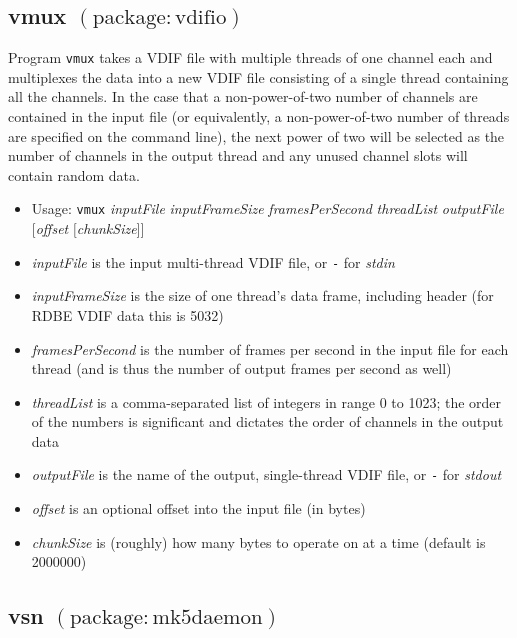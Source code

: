 
\subsection{vmux {\small $\mathrm{(package: vdifio)}$}} \label{sec:vmux}

Program {\tt vmux} takes a VDIF file with multiple threads of one channel each and multiplexes the data into a new VDIF file consisting of a single thread containing all the channels.
In the case that a non-power-of-two number of channels are contained in the input file (or equivalently, a non-power-of-two number of threads are specified on the command line), the next power of two will be selected as the number of channels in the output thread and any unused channel slots will contain random data.

\begin{itemize}
\item[] Usage: {\tt vmux} {\em inputFile} {\em inputFrameSize} {\em framesPerSecond} {\em threadList} {\em outputFile} $[${\em offset} $[${\em chunkSize}$] ]$
\item[] {\em inputFile} is the input multi-thread VDIF file, or {\tt -} for {\em stdin}
\item[] {\em inputFrameSize} is the size of one thread's data frame, including header (for RDBE VDIF data this is 5032)
\item[] {\em framesPerSecond} is the number of frames per second in the input file for each thread (and is thus the number of output frames per second as well)
\item[] {\em threadList} is a comma-separated list of integers in range 0 to 1023; the order of the numbers is significant and dictates the order of channels in the output data
\item[] {\em outputFile} is the name of the output, single-thread VDIF file, or {\tt -} for {\em stdout}
\item[] {\em offset} is an optional offset into the input file (in bytes)
\item[] {\em chunkSize} is (roughly) how many bytes to operate on at a time (default is 2000000)
\end{itemize}







\subsection{vsn {\small $\mathrm{(package: mk5daemon)}$}} \label{sec:vsntool}

